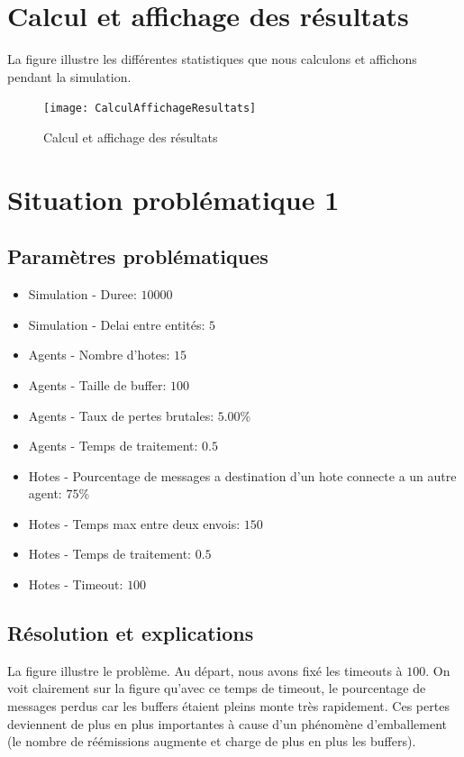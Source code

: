 \documentclass[a4paper,11pt]{article}
\begin{document}
\section{Calcul et affichage des résultats}
La figure  illustre les différentes statistiques que nous calculons et affichons pendant la simulation.

\begin{figure}[h!t]
  \centering
    \texttt{[image: CalculAffichageResultats]}
  \caption{Calcul et affichage des résultats}
  \label{fig:calcul-affichage-resultats}
\end{figure}








\section{Situation problématique 1}
\subsection{Paramètres problématiques}
\begin{itemize}
 \item Simulation - Duree: $10000$
 \item Simulation - Delai entre entités: $5$
 \item Agents - Nombre d'hotes: $15$
 \item Agents - Taille de buffer: $100$
 \item Agents - Taux de pertes brutales: $5.00$\%
 \item Agents - Temps de traitement: $0.5$
 \item Hotes - Pourcentage de messages a destination d'un hote connecte a un autre agent: $75$\%
 \item Hotes - Temps max entre deux envois: $150$
 \item Hotes - Temps de traitement: $0.5$
 \item Hotes - Timeout: \textbf{$100$}
\end{itemize}



\subsection{Résolution et explications}
La figure  illustre le problème. Au départ, nous avons fixé les timeouts à $100$. On voit clairement sur la figure qu'avec ce temps de timeout, le pourcentage de messages perdus car les buffers étaient pleins monte très rapidement. Ces pertes deviennent de plus en plus importantes à cause d'un phénomène d'emballement (le nombre de réémissions augmente et charge de plus en plus les buffers).
\end{document}

